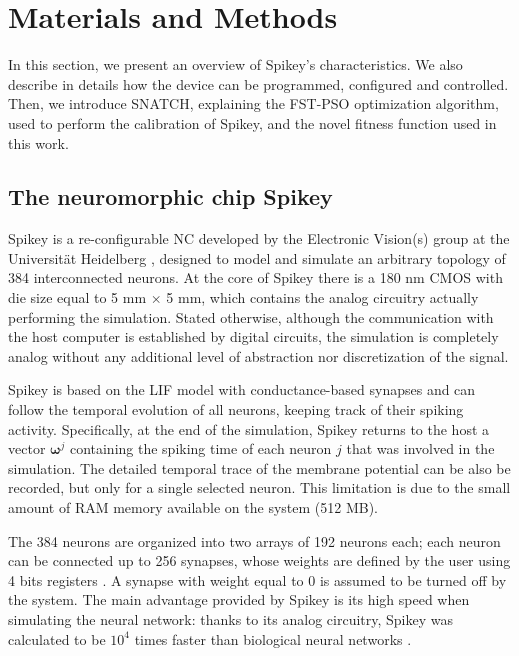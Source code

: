 \documentclass[utf8]{frontiersFPHY} %
\begin{document}
\section{Materials and Methods}
\label{sec:materials}
In this section, we present an overview of Spikey's characteristics. We also describe in details how the device can be programmed, configured and controlled. 
Then, we introduce SNATCH, explaining the FST-PSO optimization algorithm, used to perform the calibration of  Spikey, and the novel fitness function used in this work.

\subsection{The neuromorphic chip Spikey}
Spikey \citep{Pfeil2013}  is a re-configurable NC 
developed by the Electronic Vision(s) group at the Universit\"at Heidelberg \cite{Pfeil2013}, designed to model and simulate an arbitrary topology of 384 interconnected neurons.
At the core of Spikey there is a 180 nm CMOS with die size equal to 5 mm $\times$ 5 mm, which contains the analog circuitry actually performing the simulation. 
Stated otherwise, although the communication with the host computer is established by digital circuits, the simulation is completely analog without any additional level of abstraction nor discretization of the signal.




Spikey is based on the LIF model with conductance-based synapses \cite{Schemmel2007} and can follow the temporal evolution of all neurons, keeping track of their spiking activity.
Specifically, at the end of the simulation, Spikey  returns to the host a vector $\boldsymbol{\omega}^j$ containing the spiking time of each neuron $j$ that was involved in the simulation.
The detailed temporal trace of the membrane potential can be also be recorded, but only for a single selected neuron. 
This limitation is due to the small amount of RAM memory available on the system (512 MB).

The 384 neurons are organized into two arrays of 192 neurons each; each neuron can be connected up to 256 synapses, whose weights are defined by the user using 4 bits registers \cite{Pfeil2012}. 
A synapse with weight equal to 0 is assumed to be turned off by the system. 
The main advantage provided by Spikey is its high speed when simulating the neural network: thanks to its analog circuitry, Spikey was calculated to be  $10^4$ times faster than biological neural networks \cite{Pfeil2013}. 
\end{document}
